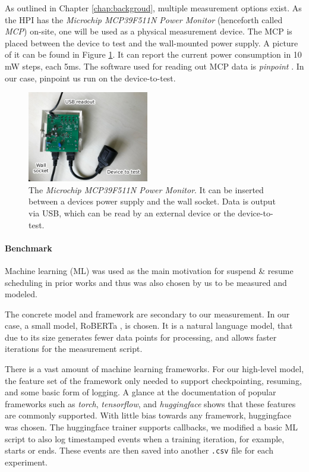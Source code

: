 As outlined in Chapter \ref{chap:backgroud}, multiple measurement options exist. 
As the HPI has the \emph{Microchip MCP39F511N Power Monitor} (henceforth called \emph{MCP}) on-site, one will be used as a physical measurement device.
The MCP is placed between the device to test and the wall-mounted power supply. 
A picture of it can be found in Figure \ref{fig:mcp}. 
It can report the current power consumption in 10 mW steps, each 5ms. 
The software used for reading out MCP data is \emph{pinpoint} \cite{kohler_pinpoint_2020}.
In our case, pinpoint us run on the device-to-test.

\begin{figure}
    \centering
    \includegraphics[width=200px]{images/mcp_graphic_design_is_my_passion.jpg}
    \caption[short]{The \emph{Microchip MCP39F511N Power Monitor}. It can be inserted between a devices power supply and the wall socket. Data is output via USB, which can be read by an external device or the device-to-test.}
    \label{fig:mcp}
\end{figure}


\paragraph{Benchmark}

Machine learning (ML) was used as the main motivation for suspend \& resume scheduling in prior works \cite {wiesner_lets_2021} and thus was also chosen by us to be measured and modeled. 

The concrete model and framework are secondary to our measurement. 
In our case, a small model, RoBERTa \cite{liu2019robertarobustlyoptimizedbert}, is chosen.
It is a natural language model, that due to its size generates fewer data points for processing, and allows faster iterations for the measurement script. 

There is a vast amount of machine learning frameworks. 
For our high-level model, the feature set of the framework only needed to support checkpointing, resuming, and some basic form of logging. 
A glance at the documentation of popular frameworks such as \emph{torch}, \emph{tensorflow}, and \emph{huggingface} shows that these features are commonly supported. 
With little bias towards any framework, huggingface was chosen.
The huggingface trainer supports callbacks, we modified a basic ML script to also log timestamped events when a training iteration, for example, starts or ends. 
These events are then saved into another \verb|.csv| file for each experiment.

